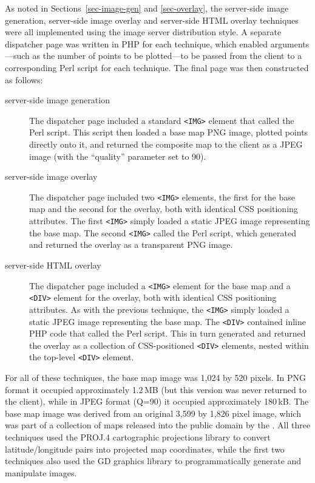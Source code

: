 \documentclass[acmtocl,acmnow]{acmtrans2m}
\begin{document}
As noted in Sections~\ref{sec-image-gen} and \ref{sec-overlay}, the
server-side image generation, server-side image overlay and server-side
HTML overlay techniques were all implemented using the image server
distribution style. A separate dispatcher page was written in PHP for
each technique, which enabled arguments---such as the number of points
to be plotted---to be passed from the client to a corresponding Perl
script for each technique. The final page was then constructed as
follows:
\begin{description}

	\item[server-side image generation] The dispatcher page included a
	standard \verb|<IMG>| element that called the Perl script. This
	script then loaded a base map PNG image, plotted points directly
	onto it, and returned the
	composite map to the client as a JPEG image (with the ``quality''
	parameter set to 90).

	\item[server-side image overlay] The dispatcher page included two
	\verb|<IMG>| elements, the first for the base map and the second for
	the overlay, both with identical CSS positioning attributes. The
	first \verb|<IMG>| simply loaded a static JPEG image representing
	the base map. The second \verb|<IMG>| called the Perl script, which
	generated and returned the overlay as a transparent PNG image.

	\item[server-side HTML overlay] The dispatcher page included a
	\verb|<IMG>| element for the base map and a \verb|<DIV>| element for
	the overlay, both with identical CSS positioning attributes. As with
	the previous technique, the \verb|<IMG>| simply loaded a static JPEG
	image representing the base map. The \verb|<DIV>| contained inline
	PHP code that called the Perl script. This in turn generated and
	returned the overlay as a collection of CSS-positioned \verb|<DIV>|
	elements, nested within the top-level \verb|<DIV>| element.

\end{description}

For all of these techniques, the base map image was 1,024 by 520 pixels.
In PNG format it occupied approximately 1.2\,MB (but this version was
never returned to the client), while in JPEG format (Q=90) it occupied
approximately 180\,kB. The base map image was derived from an original
3,599 by 1,826 pixel image, which was part of a collection of maps
released into the public domain by the . All three
techniques used the PROJ.4 cartographic projections library to convert
latitude/longitude pairs into projected map coordinates, while the first
two techniques also used the GD graphics library to programmatically
generate and manipulate images.
\end{document}
